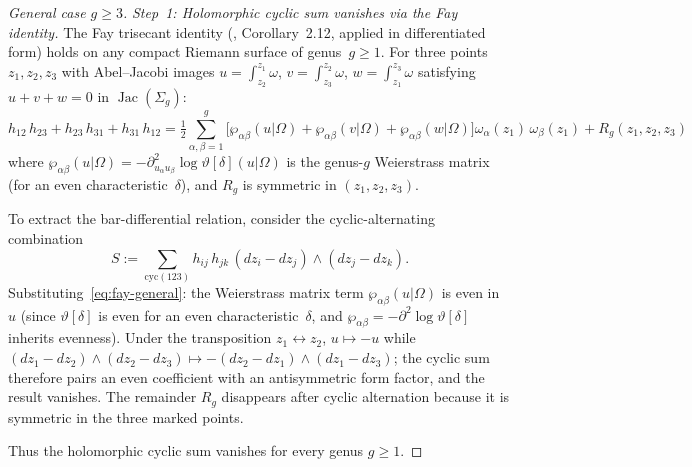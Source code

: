 \begin{proof}[General case $g \geq 3$]
\emph{Step~1: Holomorphic cyclic sum vanishes via the Fay identity.}
The Fay trisecant identity (\cite{Fay73}, Corollary~2.12,
applied in differentiated form) holds on any compact Riemann
surface of genus~$g \geq 1$. For three points $z_1, z_2, z_3$
with Abel--Jacobi images
$u = \int_{z_2}^{z_1}\omega$, $v = \int_{z_3}^{z_2}\omega$,
$w = \int_{z_1}^{z_3}\omega$ satisfying $u + v + w = 0$ in
$\operatorname{Jac}(\Sigma_g)$:
\begin{equation}\label{eq:fay-general}
h_{12}\,h_{23} + h_{23}\,h_{31} + h_{31}\,h_{12}
= \tfrac{1}{2}\sum_{\alpha,\beta=1}^{g}
\bigl[\wp_{\alpha\beta}(u|\Omega) + \wp_{\alpha\beta}(v|\Omega)
 + \wp_{\alpha\beta}(w|\Omega)\bigr]
 \omega_\alpha(z_1)\,\omega_\beta(z_1)
 + R_g(z_1, z_2, z_3)
\end{equation}
where $\wp_{\alpha\beta}(u|\Omega)
= -\partial^2_{u_\alpha u_\beta}\!\log\vartheta[\delta](u|\Omega)$
is the genus-$g$ Weierstrass matrix (for an even
characteristic~$\delta$), and $R_g$ is symmetric in
$(z_1, z_2, z_3)$.

To extract the bar-differential relation, consider the
cyclic-alternating combination
\[
S := \sum_{\mathrm{cyc}(123)}
h_{ij}\,h_{jk}\,(dz_i - dz_j) \wedge (dz_j - dz_k).
\]
Substituting~\eqref{eq:fay-general}: the Weierstrass matrix
term $\wp_{\alpha\beta}(u|\Omega)$ is even in~$u$
(since $\vartheta[\delta]$ is even for an even
characteristic~$\delta$, and $\wp_{\alpha\beta}
= -\partial^2\!\log\vartheta[\delta]$ inherits evenness).
Under the transposition $z_1 \leftrightarrow z_2$,
$u \mapsto -u$ while
$(dz_1 - dz_2) \wedge (dz_2 - dz_3) \mapsto
-(dz_2 - dz_1) \wedge (dz_1 - dz_3)$;
the cyclic sum therefore pairs an even coefficient with
an antisymmetric form factor, and the result vanishes.
The remainder $R_g$ disappears after cyclic alternation
because it is symmetric in the three marked points.

Thus the holomorphic cyclic sum vanishes for every genus
$g \geq 1$.


\end{proof}
